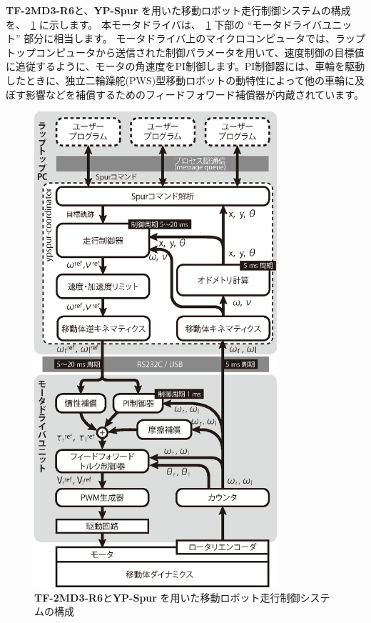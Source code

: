 \documentclass[11pt,a4j,openany,fleqn]{jbook}
\begin{document}
{\bf TF-2MD3-R6}と、{\bf YP-Spur} を用いた移動ロボット走行制御システムの構成を、\figurename~\ref{fig:yp-system} に示します。
本モータドライバは、\figurename~\ref{fig:yp-system} 下部の ``モータドライバユニット'' 部分に相当します。
モータドライバ上のマイクロコンピュータでは、ラップトップコンピュータから送信された制御パラメータを用いて、速度制御の目標値に追従するように、モータの角速度をPI制御します。PI制御器には、車輪を駆動したときに、独立二輪躁舵(PWS)型移動ロボットの動特性によって他の車輪に及ぼす影響などを補償するためのフィードフォワード補償器\cite{the:pws_ff_cnt}\cite{the:vehicle_control}が内蔵されています。\par
\begin{figure}[H]
\centering\includegraphics[width=90mm]{system2.eps}
\caption{{\bf TF-2MD3-R6}と{\bf YP-Spur} を用いた移動ロボット走行制御システムの構成}
\label{fig:yp-system}
\end{figure}


\newpage
\end{document}
